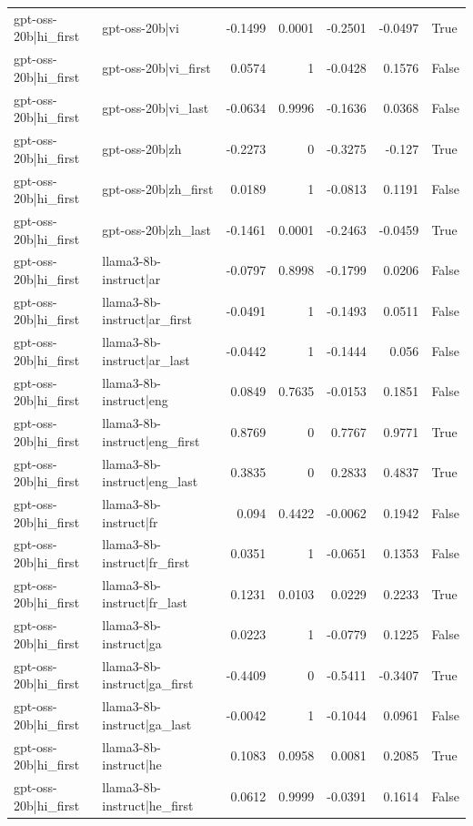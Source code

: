 \begin{table}
\begin{tabular}{l l r r r r l}
gpt-oss-20b|hi_first & gpt-oss-20b|vi & -0.1499 & 0.0001 & -0.2501 & -0.0497 & True \\
gpt-oss-20b|hi_first & gpt-oss-20b|vi_first & 0.0574 & 1 & -0.0428 & 0.1576 & False \\
gpt-oss-20b|hi_first & gpt-oss-20b|vi_last & -0.0634 & 0.9996 & -0.1636 & 0.0368 & False \\
gpt-oss-20b|hi_first & gpt-oss-20b|zh & -0.2273 & 0 & -0.3275 & -0.127 & True \\
gpt-oss-20b|hi_first & gpt-oss-20b|zh_first & 0.0189 & 1 & -0.0813 & 0.1191 & False \\
gpt-oss-20b|hi_first & gpt-oss-20b|zh_last & -0.1461 & 0.0001 & -0.2463 & -0.0459 & True \\
gpt-oss-20b|hi_first & llama3-8b-instruct|ar & -0.0797 & 0.8998 & -0.1799 & 0.0206 & False \\
gpt-oss-20b|hi_first & llama3-8b-instruct|ar_first & -0.0491 & 1 & -0.1493 & 0.0511 & False \\
gpt-oss-20b|hi_first & llama3-8b-instruct|ar_last & -0.0442 & 1 & -0.1444 & 0.056 & False \\
gpt-oss-20b|hi_first & llama3-8b-instruct|eng & 0.0849 & 0.7635 & -0.0153 & 0.1851 & False \\
gpt-oss-20b|hi_first & llama3-8b-instruct|eng_first & 0.8769 & 0 & 0.7767 & 0.9771 & True \\
gpt-oss-20b|hi_first & llama3-8b-instruct|eng_last & 0.3835 & 0 & 0.2833 & 0.4837 & True \\
gpt-oss-20b|hi_first & llama3-8b-instruct|fr & 0.094 & 0.4422 & -0.0062 & 0.1942 & False \\
gpt-oss-20b|hi_first & llama3-8b-instruct|fr_first & 0.0351 & 1 & -0.0651 & 0.1353 & False \\
gpt-oss-20b|hi_first & llama3-8b-instruct|fr_last & 0.1231 & 0.0103 & 0.0229 & 0.2233 & True \\
gpt-oss-20b|hi_first & llama3-8b-instruct|ga & 0.0223 & 1 & -0.0779 & 0.1225 & False \\
gpt-oss-20b|hi_first & llama3-8b-instruct|ga_first & -0.4409 & 0 & -0.5411 & -0.3407 & True \\
gpt-oss-20b|hi_first & llama3-8b-instruct|ga_last & -0.0042 & 1 & -0.1044 & 0.0961 & False \\
gpt-oss-20b|hi_first & llama3-8b-instruct|he & 0.1083 & 0.0958 & 0.0081 & 0.2085 & True \\
gpt-oss-20b|hi_first & llama3-8b-instruct|he_first & 0.0612 & 0.9999 & -0.0391 & 0.1614 & False \\

\end{tabular}
\end{table}
